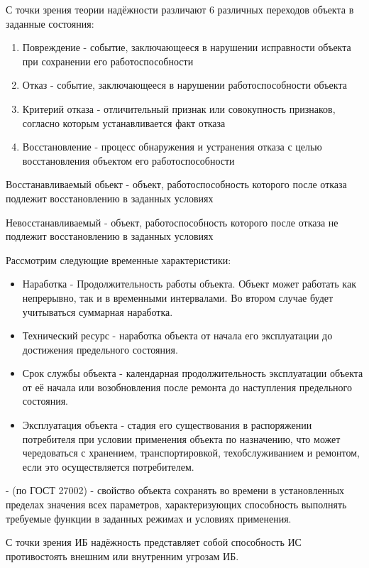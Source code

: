 \documentclass[a4paper, 12pt]{extarticle}
\begin{document}
		С точки зрения теории надёжности различают 6 различных переходов объекта в заданные состояния:
		\begin{enumerate}
			\item Повреждение - событие, заключающееся в нарушении исправности объекта при сохранении его работоспособности
			\item Отказ - событие, заключающееся в нарушении работоспособности объекта
			\item Критерий отказа - отличительный признак или совокупность признаков, согласно которым устанавливается факт отказа
			\item Восстановление - процесс обнаружения и устранения отказа с целью восстановления объектом его работоспособности
		\end{enumerate}

		Восстанавливаемый обьект - объект, работоспособность которого после отказа подлежит восстановлению в заданных условиях
		
		Невосстанавливаемый - объект, работоспособность которого после отказа не подлежит восстановлению в заданных условиях

		Рассмотрим следующие временные характеристики:
		\begin{itemize}
			\item Наработка - Продолжительность работы объекта. Объект может работать как непрерывно, так и в временными интервалами. Во втором случае будет учитываться суммарная наработка.
			\item Технический ресурс - наработка объекта от начала его эксплуатации до достижения предельного состояния.
			\item Срок службы объекта - календарная продолжительность эксплуатации объекта от её начала или возобновления после ремонта до наступления предельного состояния.
			\item Эксплуатация объекта - стадия его существования в распоряжении потребителя при условии применения объекта по назначению, что может чередоваться с хранением, транспортировкой, техобслуживанием и ремонтом, если это осуществляется потребителем.
		\end{itemize}

		 - (по ГОСТ 27002) - свойство объекта сохранять во времени в установленных пределах значения всех параметров, характеризующих способность выполнять требуемые функции в заданных режимах и условиях применения.

		С точки зрения ИБ надёжность представляет собой способность ИС противостоять внешним или внутренним угрозам ИБ.
\end{document}
